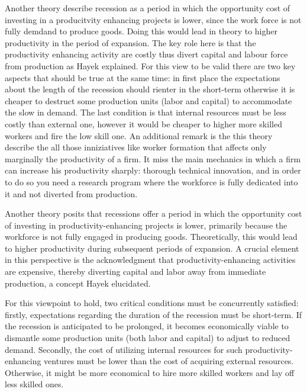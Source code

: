 \documentclass[12pt]{article}
\begin{document}
Another theory describe recession as a period in which the opportunity cost of investing in a producitvity enhancing
projects is lower, since the work force is not fully demdand to produce goods. Doing this would lead in theory to higher
productivity in the period of expansion. The key role here is that the productivity enhancing activity are costly thus
divert capital and labour force from production as Hayek \cite{Hay33} explained. 
For this view to be valid there are two key aspects that should be true at the same time: in first place the
expectations about the length of the recession should rienter in the short-term otherwise it is cheaper to destruct some
production units (labor and capital) to accommodate the slow in demand. The last condition is that internal resources
must be less costly than external one, however it would be cheaper to higher more skilled workers and fire the low skill
one. An additional remark is the this theory describe the all those inniziatives like worker formation that affects only
marginally the productivity of a firm. It miss the main mechanics in which a firm can increase his productivity sharply: thorough technical
innovation, and in order to do so you need a research program where the workforce is fully dedicated into it and not
diverted from production.

Another theory posits that recessions offer a period in which the opportunity cost of investing in
productivity-enhancing projects is lower, primarily because the workforce is not fully engaged in producing goods.
Theoretically, this would lead to higher productivity during subsequent periods of expansion. A crucial element in this
perspective is the acknowledgment that productivity-enhancing activities are expensive, thereby diverting capital and
labor away from immediate production, a concept Hayek \cite{Hay33} elucidated. 

For this viewpoint to hold, two critical conditions must be concurrently satisfied: firstly, expectations regarding the
duration of the recession must be short-term. If the recession is anticipated to be prolonged, it becomes economically
viable to dismantle some production units (both labor and capital) to adjust to reduced demand. Secondly, the cost of
utilizing internal resources for such productivity-enhancing ventures must be lower than the cost of acquiring external
resources. Otherwise, it might be more economical to hire more skilled workers and lay off less skilled ones.  
\end{document}
